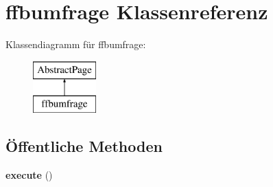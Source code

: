 \hypertarget{classffbumfrage}{}\section{ffbumfrage Klassenreferenz}
\label{classffbumfrage}
Klassendiagramm für ffbumfrage\+:\begin{figure}[H]
\begin{center}
\leavevmode
\includegraphics[height=2.000000cm]{classffbumfrage}
\end{center}
\end{figure}
\subsection*{Öffentliche Methoden}
\begin{DoxyCompactItemize}
\item 
\mbox{\label{classffbumfrage_adad388c645f475e492e0838c8370c6b7}} 
{\bfseries execute} ()
\end{DoxyCompactItemize}
